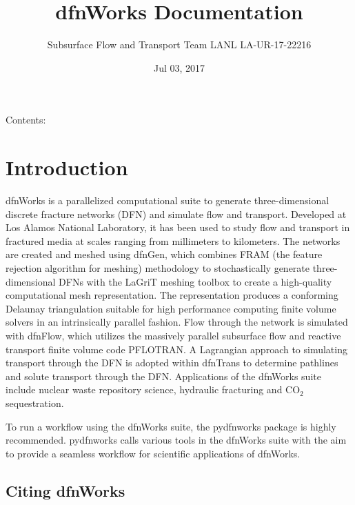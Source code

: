 \documentclass[letterpaper,10pt,english]{sphinxmanual}
\title{dfnWorks Documentation}
\date{Jul 03, 2017}
\author{Subsurface Flow and Transport Team 
 LANL 
 LA-UR-17-22216}
\begin{document}
\maketitle
\sphinxtableofcontents
{}\label{\detokenize{index::doc}}


Contents:


\chapter{Introduction}
\label{\detokenize{intro:introduction}}\label{\detokenize{intro:welcome-to-dfnworks-2-0-documentation}}\label{\detokenize{intro::doc}}
dfnWorks is a parallelized computational suite to generate three-dimensional
discrete fracture networks (DFN) and simulate flow and transport. Developed at
Los Alamos National Laboratory, it has been used to study flow and transport
in fractured media at scales ranging from millimeters to kilometers. The
networks are created and meshed using dfnGen, which combines FRAM (the feature
rejection algorithm for meshing) methodology to stochastically generate
three-dimensional DFNs with the LaGriT meshing toolbox to create a high-quality
computational mesh representation. The representation produces a conforming
Delaunay triangulation suitable for high performance computing finite volume
solvers in an intrinsically parallel fashion. Flow through the network is
simulated with dfnFlow, which utilizes the massively parallel subsurface flow
and reactive transport finite volume code PFLOTRAN. A Lagrangian approach to
simulating transport through the DFN is adopted within dfnTrans to determine
pathlines and solute transport through the DFN. Applications of the dfnWorks
suite include nuclear waste repository science, hydraulic fracturing and
CO$_{\text{2}}$ sequestration.

To run a workflow using the dfnWorks suite, the pydfnworks package is
highly recommended. pydfnworks calls various tools in the dfnWorks suite with
the aim to provide a seamless workflow for scientific applications of dfnWorks.


\section{Citing dfnWorks}
\label{\detokenize{intro:citing-dfnworks}}
\end{document}
